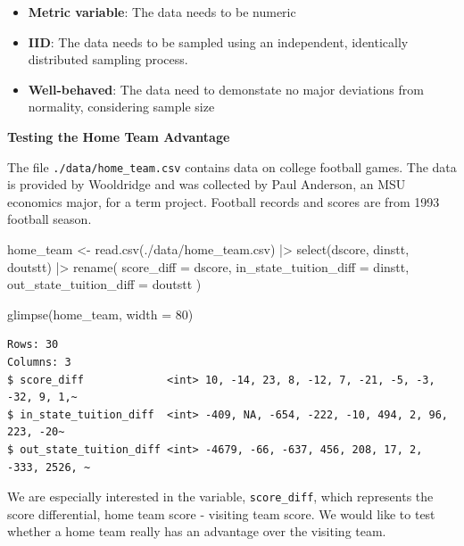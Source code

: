 \documentclass[
  letterpaper,
  DIV=11,
  numbers=noendperiod]{scrreprt}
\newenvironment{Shaded}{\begin{snugshade}}{\end{snugshade}}
\newcommand{\AttributeTok}[1]{\textcolor[rgb]{0.40,0.45,0.13}{#1}}
\newcommand{\DecValTok}[1]{\textcolor[rgb]{0.68,0.00,0.00}{#1}}
\newcommand{\FunctionTok}[1]{\textcolor[rgb]{0.28,0.35,0.67}{#1}}
\newcommand{\NormalTok}[1]{\textcolor[rgb]{0.00,0.23,0.31}{#1}}
\newcommand{\OtherTok}[1]{\textcolor[rgb]{0.00,0.23,0.31}{#1}}
\newcommand{\SpecialCharTok}[1]{\textcolor[rgb]{0.37,0.37,0.37}{#1}}
\newcommand{\StringTok}[1]{\textcolor[rgb]{0.13,0.47,0.30}{#1}}
\providecommand{\tightlist}{%
  \setlength{\itemsep}{0pt}\setlength{\parskip}{0pt}}\usepackage{longtable,booktabs,array}
\begin{document}
\begin{itemize}
\tightlist
\item
  \textbf{Metric variable}: The data needs to be numeric
\item
  \textbf{IID}: The data needs to be sampled using an independent,
  identically distributed sampling process.
\item
  \textbf{Well-behaved}: The data need to demonstate no major deviations
  from normality, considering sample size
\end{itemize}

\textbf{Testing the Home Team Advantage}

The file \texttt{./data/home\_team.csv} contains data on college
football games. The data is provided by Wooldridge and was collected by
Paul Anderson, an MSU economics major, for a term project. Football
records and scores are from 1993 football season.

\begin{Shaded}
\begin{Highlighting}[]
\NormalTok{home\_team }\OtherTok{\textless{}{-}} \FunctionTok{read.csv}\NormalTok{(}\StringTok{\textquotesingle{}./data/home\_team.csv\textquotesingle{}}\NormalTok{) }\SpecialCharTok{|\textgreater{}} 
  \FunctionTok{select}\NormalTok{(dscore, dinstt, doutstt) }\SpecialCharTok{|\textgreater{}} 
  \FunctionTok{rename}\NormalTok{(}
    \AttributeTok{score\_diff               =}\NormalTok{ dscore, }
    \AttributeTok{in\_state\_tuition\_diff    =}\NormalTok{ dinstt, }
    \AttributeTok{out\_state\_tuition\_diff   =}\NormalTok{ doutstt}
\NormalTok{  )}

\FunctionTok{glimpse}\NormalTok{(home\_team, }\AttributeTok{width =} \DecValTok{80}\NormalTok{)}
\end{Highlighting}
\end{Shaded}

\begin{verbatim}
Rows: 30
Columns: 3
$ score_diff             <int> 10, -14, 23, 8, -12, 7, -21, -5, -3, -32, 9, 1,~
$ in_state_tuition_diff  <int> -409, NA, -654, -222, -10, 494, 2, 96, 223, -20~
$ out_state_tuition_diff <int> -4679, -66, -637, 456, 208, 17, 2, -333, 2526, ~
\end{verbatim}

We are especially interested in the variable, \texttt{score\_diff},
which represents the score differential, home team score - visiting team
score. We would like to test whether a home team really has an advantage
over the visiting team.
\end{document}
